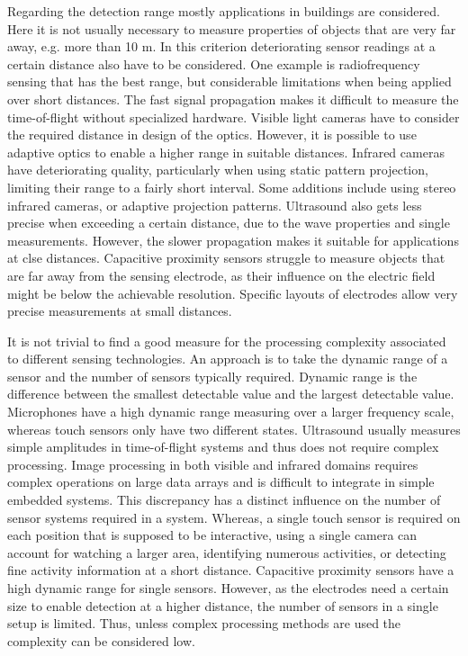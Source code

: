 Regarding the detection range mostly applications in buildings are considered. Here it is not usually necessary to measure properties of objects that are very far away, e.g. more than 10 m. In this criterion deteriorating sensor readings at a certain distance also have to be considered. One example is radiofrequency sensing that has the best range, but considerable limitations when being applied over short distances. The fast signal propagation makes it difficult to measure the time-of-flight without specialized hardware. Visible light cameras have to consider the required distance in design of the optics. However, it is possible to use adaptive optics to enable a higher range in suitable distances. Infrared cameras have deteriorating quality, particularly when using static pattern projection, limiting their range to a fairly short interval. Some additions include using stereo infrared cameras, or adaptive projection patterns. Ultrasound also gets less precise when exceeding a certain distance, due to the wave properties and single measurements. However, the slower propagation makes it suitable for applications at clse distances. Capacitive proximity sensors struggle to measure objects that are far away from the sensing electrode, as their influence on the electric field might be below the achievable resolution. Specific layouts of electrodes allow very precise measurements at small distances.

It is not trivial to find a good measure for the processing complexity associated to different sensing technologies. An approach is to take the dynamic range of a sensor and the number of sensors typically required. Dynamic range is the difference between the smallest detectable value and the largest detectable value. Microphones have a high dynamic range measuring over a larger frequency scale, whereas touch sensors only have two different states. Ultrasound usually measures simple amplitudes in time-of-flight systems and thus does not require complex processing. Image processing in both visible and infrared domains requires complex operations on large data arrays and is difficult to integrate in simple embedded systems. This discrepancy has a distinct influence on the number of sensor systems required in a system. Whereas, a single touch sensor is required on each position that is supposed to be interactive, using a single camera can account for watching a larger area, identifying numerous activities, or detecting fine activity information at a short distance. Capacitive proximity sensors have a high dynamic range for single sensors. However, as the electrodes need a certain size to enable detection at a higher distance, the number of sensors in a single setup is limited. Thus, unless complex processing methods are used the complexity can be considered low.

